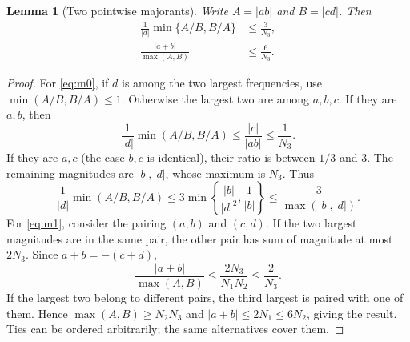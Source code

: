 \documentclass[11pt]{article}
\newtheorem{lemma}[theorem]{Lemma}
\theoremstyle{remark}\newtheorem{remark}[theorem]{Remark}
\newcommand{\abs}[1]{\left|#1\right|}
\begin{document}
\begin{lemma}[Two pointwise majorants]\label{lem:geometry}
Write $A=\abs{ab}$ and $B=\abs{cd}$. Then
\begin{align}
\frac1{\abs d}\min\{A/B,B/A\}&\leq\frac3{N_3},\label{eq:m0}\\
\frac{\abs{a+b}}{\max(A,B)}&\leq\frac6{N_3}.\label{eq:m1}
\end{align}
\end{lemma}
\begin{proof}
For \eqref{eq:m0}, if $d$ is among the two largest frequencies, use
$\min(A/B,B/A)\leq1$. Otherwise the largest two are among $a,b,c$.
If they are $a,b$, then
\[
\frac1{\abs d}\min(A/B,B/A)\leq\frac{\abs c}{\abs{ab}}
\leq\frac1{N_3}.
\]
If they are $a,c$ (the case $b,c$ is identical), their ratio is between
$1/3$ and $3$. The remaining magnitudes are $\abs b,\abs d$, whose maximum is
$N_3$. Thus
\[
\frac1{\abs d}\min(A/B,B/A)
\leq3\min\left\{\frac{\abs b}{\abs d^2},\frac1{\abs b}\right\}
\leq\frac3{\max(\abs b,\abs d)}.
\]
For \eqref{eq:m1}, consider the pairing $(a,b)$ and $(c,d)$.
If the two largest magnitudes are in the same pair, the other pair has
sum of magnitude at most $2N_3$. Since $a+b=-(c+d)$,
\[
\frac{\abs{a+b}}{\max(A,B)}\leq\frac{2N_3}{N_1N_2}\leq\frac2{N_3}.
\]
If the largest two belong to different pairs, the third largest is paired
with one of them. Hence $\max(A,B)\geq N_2N_3$ and
$\abs{a+b}\leq2N_1\leq6N_2$, giving the result.
Ties can be ordered arbitrarily; the same alternatives cover them.
\end{proof}
\end{document}
